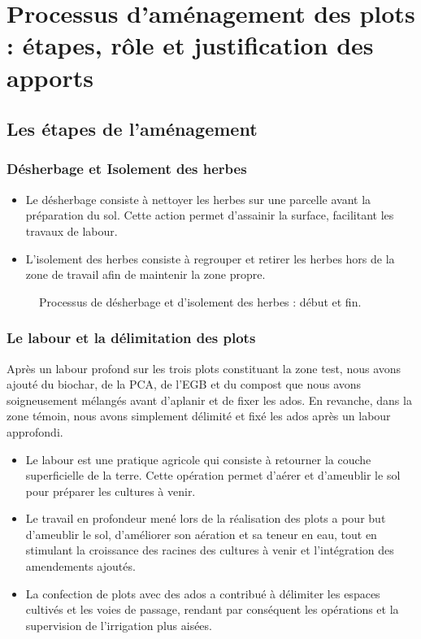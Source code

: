 \section{Processus d'aménagement des plots : étapes, rôle et justification des apports}
\subsection{Les étapes de l'aménagement}
\subsubsection{Désherbage et Isolement des herbes}
\begin{itemize}[label=$\bullet$]
   	 \item Le désherbage consiste à nettoyer les herbes sur une parcelle avant la préparation du sol. Cette action permet d’assainir la surface, facilitant les travaux de labour.
	\end{itemize}

\begin{itemize}[label=$\bullet$]
   	 \item L’isolement des herbes consiste à regrouper et retirer les herbes  hors de la zone de travail afin de maintenir la zone propre.
	\end{itemize}

    \begin{figure}[H]
    \centering
    \caption{Processus de désherbage et d’isolement des herbes : début et fin. }
    \label{fig:desherbage2}
\end{figure}

\subsubsection{Le labour et la délimitation des plots}
Après un labour profond sur les trois plots constituant la zone test, nous avons ajouté du biochar, de la PCA, de l'EGB et du compost que nous avons soigneusement mélangés avant d'aplanir et de fixer les ados. En revanche, dans la zone témoin, nous avons simplement délimité et fixé les ados après un labour approfondi.

\begin{itemize}[label=$\bullet$]
\item Le labour est une pratique agricole qui consiste à retourner la couche superficielle de la terre. Cette opération permet d'aérer et d’ameublir le sol pour préparer les cultures à venir.

\item Le travail en profondeur mené lors de la réalisation des plots a pour but d'ameublir le sol, d'améliorer son aération et sa teneur en eau, tout en stimulant la croissance des racines des cultures à venir et l'intégration des amendements ajoutés.

\item La confection de plots avec des ados a contribué à délimiter les espaces cultivés et les voies de passage, rendant par conséquent les opérations et la supervision de l'irrigation plus aisées.
\end{itemize}

